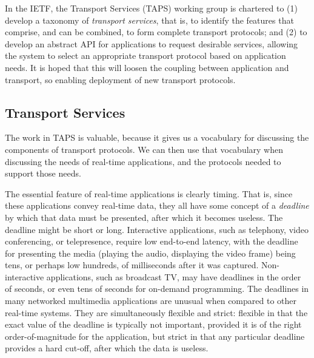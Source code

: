 \documentclass{sig-alternate-05-2015}
\begin{document}
In the IETF, the Transport Services (TAPS) working group is chartered to 
(1) develop a taxonomy of \emph{transport services}, that is, to identify the
features that comprise, and can be combined, to form complete transport
protocols; and (2) to develop an abstract API for applications to request
desirable services, allowing the system to select an appropriate transport
protocol based on application needs. It is hoped that this will loosen the
coupling between application and transport, so enabling deployment of new 
transport protocols.

\subsection{Transport Services}

The work in TAPS is valuable, because it gives us a vocabulary for
discussing the components of transport protocols.  We can then use that
vocabulary when discussing the needs of real-time applications, and the
protocols needed to support those needs.

The essential feature of real-time applications is clearly timing. That is,
since these applications convey real-time data, they all have some concept
of a \emph{deadline} by which that data must be presented, after which it
becomes useless. 
The deadline might be short or long. Interactive applications, such as
telephony, video conferencing, or telepresence, require low end-to-end
latency, with the deadline for presenting the media (playing the audio,
displaying the video frame) being tens, or perhaps low hundreds, of
milliseconds after it was captured. Non-interactive applications, such as
broadcast TV, may have deadlines in the order of seconds, or even tens of
seconds for on-demand programming. 
The deadlines in many networked multimedia applications are unusual when
compared to other real-time systems. They are simultaneously flexible and
strict: flexible in that the exact value of the deadline is typically not
important, provided it is of the right order-of-magnitude for the
application, but strict in that any particular deadline provides a hard
cut-off, after which the data is useless. 
\end{document}
